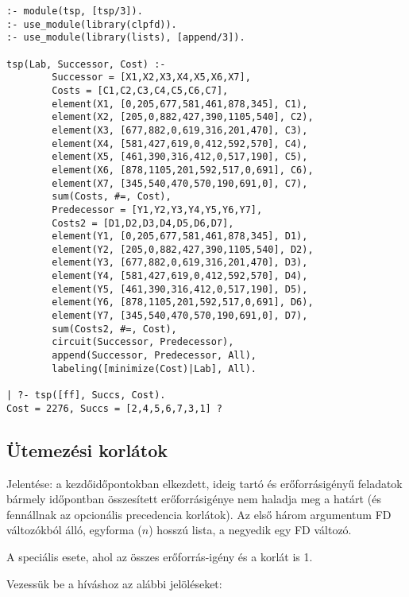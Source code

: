 \begin{verbatim}
:- module(tsp, [tsp/3]).
:- use_module(library(clpfd)).
:- use_module(library(lists), [append/3]).

tsp(Lab, Successor, Cost) :-
        Successor = [X1,X2,X3,X4,X5,X6,X7],
        Costs = [C1,C2,C3,C4,C5,C6,C7],
        element(X1, [0,205,677,581,461,878,345], C1),
        element(X2, [205,0,882,427,390,1105,540], C2),
        element(X3, [677,882,0,619,316,201,470], C3),
        element(X4, [581,427,619,0,412,592,570], C4),
        element(X5, [461,390,316,412,0,517,190], C5),
        element(X6, [878,1105,201,592,517,0,691], C6),
        element(X7, [345,540,470,570,190,691,0], C7),
        sum(Costs, #=, Cost),
        Predecessor = [Y1,Y2,Y3,Y4,Y5,Y6,Y7],
        Costs2 = [D1,D2,D3,D4,D5,D6,D7],
        element(Y1, [0,205,677,581,461,878,345], D1),
        element(Y2, [205,0,882,427,390,1105,540], D2),
        element(Y3, [677,882,0,619,316,201,470], D3),
        element(Y4, [581,427,619,0,412,592,570], D4),
        element(Y5, [461,390,316,412,0,517,190], D5),
        element(Y6, [878,1105,201,592,517,0,691], D6),
        element(Y7, [345,540,470,570,190,691,0], D7),
        sum(Costs2, #=, Cost),
        circuit(Successor, Predecessor),
        append(Successor, Predecessor, All),
        labeling([minimize(Cost)|Lab], All).

| ?- tsp([ff], Succs, Cost).
Cost = 2276, Succs = [2,4,5,6,7,3,1] ? 
\end{verbatim}

\subsection{Ütemezési korlátok}

{}

Jelentése: a  kezdőidőpontokban elkezdett,  ideig tartó
és  erőforrásigényű feladatok bármely időpontban összesített
erőforrásigénye nem haladja meg a  határt (és fennállnak az opcionális
precedencia korlátok). Az első három argumentum FD változókból álló, egyforma ($n$)
hosszú lista, a negyedik egy FD változó. 

\medskip

{}

A  speciális esete, ahol az összes erőforrás-igény és a korlát is 1.

\br
Vezessük be a  híváshoz az alábbi jelöléseket:

